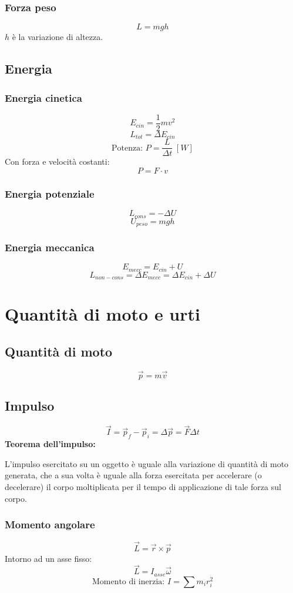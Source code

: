 \documentclass[a4paper]{article}
\theoremstyle{break}
\theoremstyle{break}
\theoremstyle{break}
\theoremstyle{break}
\begin{document}
\subsubsection{Forza peso}
\[
L = mgh
\] 
\( h \) è la variazione di altezza.

\subsection{Energia}
\subsubsection{Energia cinetica}
\[
  E_{cin} = \frac{1}{2} m v^2
\] 
\[
  L_{tot} = \Delta E_{cin}
\] 
\[
  \text{Potenza: } P = \frac{L}{\Delta t}\; [W]
\] 
Con forza e velocità costanti:
\[
P = F \cdot v
\] 

\subsubsection{Energia potenziale}
\[
  L_{cons} = - \Delta U
\] 
\[
  U_{peso} = mgh
\]

\subsubsection{Energia meccanica}
\[
  E_{mecc} = E_{cin} + U
\]
\[
  L_{non-cons} = \Delta E_{mecc} = \Delta E_{cin} + \Delta U
\] 

\section{Quantità di moto e urti}
\subsection{Quantità di moto}
\[
  \vec{p} = m \vec{v}
\]
\subsection{Impulso}
\[
  \vec{I} = \vec{p}_f - \vec{p}_i = \Delta \vec{p} = \vec{F} \Delta t
\]
\textbf{Teorema dell'impulso:}

\noindent L’impulso esercitato su un oggetto è uguale alla variazione di quantità di moto generata, che a sua
volta è uguale alla forza esercitata per accelerare (o decelerare) il corpo moltiplicata per il tempo di
applicazione di tale forza sul corpo.

\subsubsection{Momento angolare}
\[
  \vec{L} = \vec{r} \times \vec{p}
\]
Intorno ad un asse fisso:
\[
  \vec{L} = I_{asse} \vec{\omega}
\]
\[
\text{Momento di inerzia: } I = \sum m_i r_i^2
\] 
\end{document}
